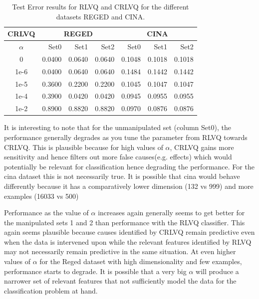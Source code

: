 \documentclass{esannV2}
\begin{document}
\begin{table}
	\centering
			\begin{footnotesize}
\begin{tabular}{|c|r|r|r|r|r|r|}
\hline
     CRLVQ &         \multicolumn{ 3}{|c|}{REGED} &          \multicolumn{ 3}{|c|}{CINA}  \\
\hline
$\alpha$ &     Set0 &       Set1 &       Set2 &       Set0 &       Set1 &       Set2 \\
\hline
  0    &     0.0400 &     0.0640 &     0.0640 &     0.1048 &     0.1018 &     0.1018 \\
\hline
  1e-6 &     0.0400 &     0.0640 &     0.0640 &     0.1484 &     0.1442 &     0.1442 \\
\hline
  1e-5 &     0.3600 &     0.2200 &     0.2200 &     0.1045 &     0.1047 &     0.1047  \\
\hline
  1e-4 &     0.3900 &     0.0420 &     0.0420 &     0.0945 &     0.0955 &     0.0955  \\
\hline
  1e-2 &     0.8900 &     0.8820 &     0.8820 &     0.0970 &     0.0876 &     0.0876  \\
\hline
\end{tabular}   
			\end{footnotesize}
	\caption{Test Error results for RLVQ and CRLVQ for the different datasets REGED and CINA.}
	\label{tab:TestErrorResults}
\end{table}

It is interesting to note that for the unmanipulated set (column Set0), the performance generally degrades as you tune the parameter from RLVQ towards CRLVQ. This is plausible because for high values of $\alpha$, CRLVQ gains more sensitivity and hence filters out more false causes(e.g. effects) which would potentially be relevant for classification hence degrading the performance. For the cina dataset this is not necessarily true. It is possible that cina would behave differently because it has a comparatively lower dimension (132 vs 999) and more examples (16033 vs 500)

Performance as the value of $\alpha$ increases again generally seems to get better for the manipulated sets 1 and 2 than performance with the RLVQ classifier. This again seems plausible because causes identified by CRLVQ remain predictive even when the data is intervened upon while the relevant features identified by RLVQ may not necessarily remain predictive in the same situation. At even higher values of $\alpha$ for the Reged dataset with high dimensionality and few examples, performance starts to degrade. It is possible that a very big $\alpha$ will produce a narrower set of relevant features that not sufficiently model the data for the classification problem at hand.
\end{document}
